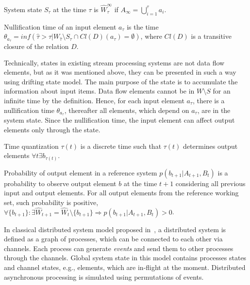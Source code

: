 \begin{definition}{System state}
$S_\tau$ at the time $\tau$ is $\widehat{W}_\tau^{\infty}$ if $A_{\infty}=\bigcup\limits_{i=1}^{\tau}{a_i}$.
\end{definition}

\begin{definition}{Nullification time}
of an input element $a_\tau$ is the time $\theta_{a_\tau}=inf(\hat{\tau}>\tau|W_{\hat{\tau}}\setminus{S_{\hat{\tau}}}\cap{Cl(D)(a_\tau)=\emptyset})$, where $Cl(D)$ is a transitive closure of the relation $D$.
\end{definition}

Technically, states in existing stream processing systems are not data flow elements, but as it was mentioned above, they can be presented in such a way using drifting state model. The main purpose of the state is to accumulate the information about input items. Data flow elements cannot be in $W\setminus{S}$ for an infinite time by the definition. Hence, for each input element $a_\tau$, there is a nullification time $\theta_{a_\tau}$, thereafter all elements, which depend on $a_\tau$, are in the system state. Since the nullification time, the input element can affect output elements only through the state.

\begin{definition}{Time quantization}
$\tau(t)$ is a discrete time such that $\tau(t)$ determines output elements $\forall{t}\exists{b_{\tau(t)}}$.
\end{definition}

\begin{definition}{Probability of output element in a reference system}
$p(b_{t+1}|A_{t+1}, B_t)$ is a probability to observe output element $b$ at the time $t+1$ considering all previous input and output elements. For all output elements from the reference working set, such probability is positive,\\
$\forall{\{b_{t+1}\}:\exists{\widehat{W}_{t+1}=\widehat{W}_{t}\setminus{\{b_{t+1}\}}}} \Rightarrow p(b_{t+1}|A_{t+1}, B_t) > 0$.
\end{definition}

In classical distributed system model proposed in~\cite{Chandy:1985:DSD:214451.214456}, a distributed system is defined as a graph of processes, which can be connected to each other via channels. Each process can generate {\em events} and send them to other processes through the channels. Global system state in this model contains processes states and channel states, e.g., elements, which are in-flight at the moment. Distributed asynchronous processing is simulated using permutations of events. 

